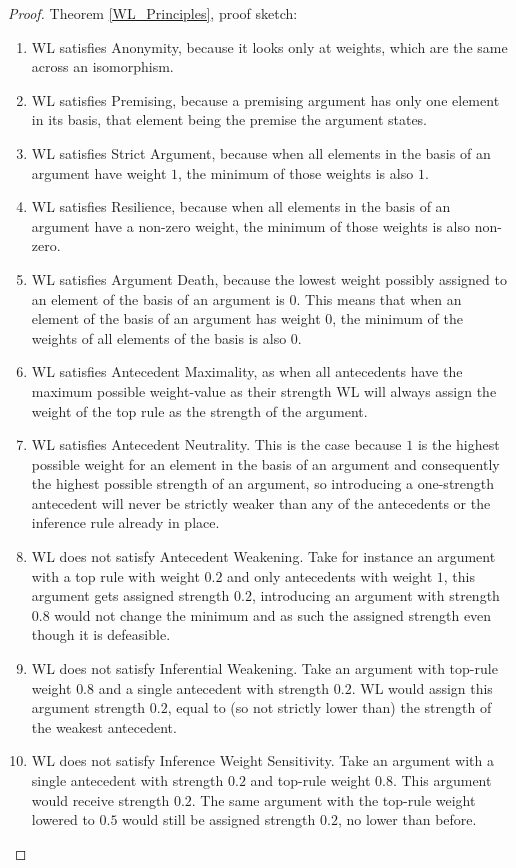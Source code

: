 \documentclass[runningheads]{llncs}
\begin{document}
\begin{proof}Theorem \ref{WL_Principles}, proof sketch:
\begin{enumerate}
    \item WL satisfies Anonymity, because it looks only at weights, which are the same across an isomorphism.
    \item WL satisfies Premising, because a premising argument has only one element in its basis, that element being the premise the argument states.
    \item WL satisfies Strict Argument, because when all elements in the basis of an argument have weight $1$, the minimum of those weights is also $1$.
    \item WL satisfies Resilience, because when all elements in the basis of an argument have a non-zero weight, the minimum of those weights is also non-zero.
    \item WL satisfies Argument Death, because the lowest weight possibly assigned to an element of the basis of an argument is $0$. This means that when an element of the basis of an argument has weight $0$, the minimum of the weights of all elements of the basis is also $0$.
    \item WL satisfies Antecedent Maximality, as when all antecedents have the maximum possible weight-value as their strength WL will always assign the weight of the top rule as the strength of the argument.
    \item WL satisfies Antecedent Neutrality. This is the case because $1$ is the highest possible weight for an element in the basis of an argument and consequently the highest possible strength of an argument, so introducing a one-strength antecedent will never be strictly weaker than any of the antecedents or the inference rule already in place.
    \item WL does not satisfy Antecedent Weakening. Take for instance an argument with a top rule with weight $0.2$ and only antecedents with weight $1$, this argument gets assigned strength $0.2$, introducing an argument with strength $0.8$ would not change the minimum and as such the assigned strength even though it is defeasible.
    \item WL does not satisfy Inferential Weakening. Take an argument with top-rule  weight $0.8$ and a single antecedent with strength $0.2$. WL would assign this argument strength $0.2$, equal to (so not strictly lower than) the strength of the weakest antecedent.
    \item WL does not satisfy Inference Weight Sensitivity. Take an argument with a single antecedent with strength $0.2$ and top-rule weight $0.8$. This argument would receive strength $0.2$. The same argument with the top-rule weight lowered to $0.5$ would still be assigned strength $0.2$, no lower than before.

\end{enumerate}
\end{proof}
\end{document}

